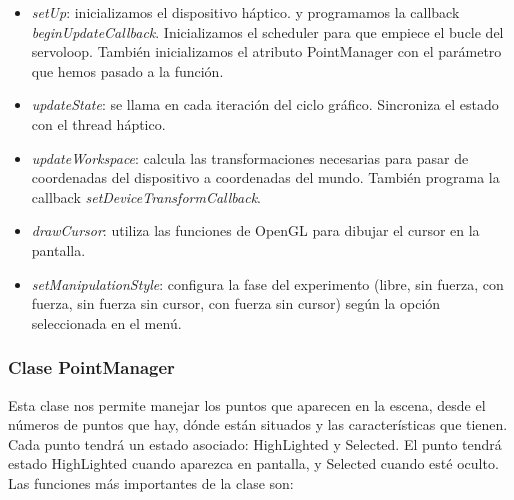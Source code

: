 \documentclass[a4paper,11pt, oneside]{book}
\begin{document}
\begin{itemize}
	\item \textit{setUp}: inicializamos el dispositivo háptico. y programamos la callback \textit{beginUpdateCallback}. Inicializamos el scheduler para que empiece el bucle del servoloop. También inicializamos el atributo PointManager con el parámetro que hemos pasado a la función.

	
	\item \textit{updateState}: se llama en cada iteración del ciclo gráfico. Sincroniza el estado con el thread háptico.
	
	\item \textit{updateWorkspace}: calcula las transformaciones necesarias para pasar de coordenadas del dispositivo a coordenadas del mundo. También programa la callback \textit{setDeviceTransformCallback}.
		
	\item \textit{drawCursor}: utiliza las funciones de OpenGL para dibujar el cursor en la pantalla.
	
	\item \textit{setManipulationStyle}: configura la fase del experimento (libre, sin fuerza, con fuerza, sin fuerza sin cursor, con fuerza sin cursor) según la opción seleccionada en el menú.
\end{itemize}


\subsubsection{Clase PointManager}

Esta clase nos permite manejar los puntos que aparecen en la escena, desde el números de puntos que hay, dónde están situados y las características que tienen. Cada punto tendrá un estado asociado: HighLighted y Selected. El punto tendrá estado HighLighted cuando aparezca en pantalla, y Selected cuando esté oculto. Las funciones más importantes de la clase son:
\end{document}
